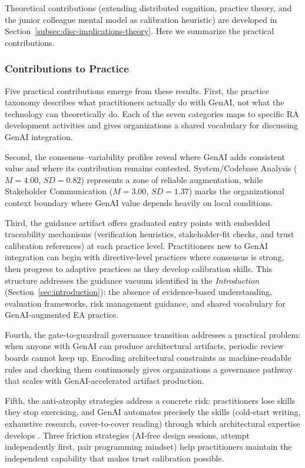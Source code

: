 Theoretical contributions (extending distributed cognition, practice theory,
and the junior colleague mental model as calibration heuristic) are developed
in Section~\ref{subsec:disc-implications-theory}. Here we summarize the
practical contributions.

\subsubsection{Contributions to Practice}

Five practical contributions emerge from these results. First, the practice
taxonomy describes what practitioners actually do with GenAI, not what the
technology can theoretically do. Each of the seven categories maps to specific
RA development activities and gives organizations a shared vocabulary for
discussing GenAI integration.

Second, the consensus--variability profiles reveal where GenAI adds consistent
value and where its contribution remains contested. System/Codebase Analysis
($M = 4.00$, $SD = 0.82$) represents a zone of reliable augmentation, while
Stakeholder Communication ($M = 3.00$, $SD = 1.37$) marks the organizational
context boundary where GenAI value depends heavily on local conditions.

Third, the guidance artifact offers graduated entry points with embedded
traceability mechanisms (verification heuristics, stakeholder-fit checks, and
trust calibration references) at each practice level. Practitioners new to
GenAI integration can begin with directive-level practices where consensus is
strong, then progress to adaptive practices as they develop calibration skills.
This structure addresses the guidance vacuum identified in
the \textit{Introduction} (Section~\ref{sec:introduction}): the absence of evidence-based
understanding, evaluation frameworks, risk management guidance, and shared
vocabulary for GenAI-augmented EA practice.

Fourth, the gate-to-guardrail governance transition addresses a practical
problem: when anyone with GenAI can produce architectural artifacts, periodic
review boards cannot keep up. Encoding architectural constraints as
machine-readable rules and checking them continuously gives organizations a
governance pathway that scales with GenAI-accelerated artifact production.

Fifth, the anti-atrophy strategies address a concrete risk: practitioners lose
skills they stop exercising, and GenAI automates precisely the skills (cold-start
writing, exhaustive research, cover-to-cover reading) through which architectural
expertise develops \parencite{kabashkin_cognitive_atrophy_2025}. Three friction
strategies (AI-free design sessions, attempt independently first, pair
programming mindset) help practitioners maintain the independent capability that
makes trust calibration possible.

